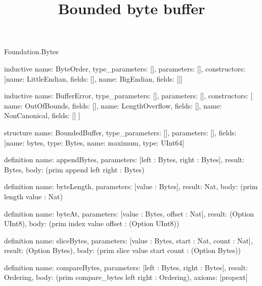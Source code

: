 \begin{lexlean}{Foundation.Bytes}
\title{Bounded byte buffer}
\begin{semanticmodule}
inductive{
  name: ByteOrder,
  type_parameters: [],
  parameters: [],
  constructors: [{name: LittleEndian, fields: []}, {name: BigEndian, fields: []}]
}

inductive{
  name: BufferError,
  type_parameters: [],
  parameters: [],
  constructors: [
    {name: OutOfBounds, fields: []},
    {name: LengthOverflow, fields: []},
    {name: NonCanonical, fields: []}
  ]
}

structure{
  name: BoundedBuffer,
  type_parameters: [],
  parameters: [],
  fields: [{name: bytes, type: Bytes}, {name: maximum, type: UInt64}]
}

definition{
  name: appendBytes,
  parameters: [left : Bytes, right : Bytes],
  result: Bytes,
  body: (prim append left right : Bytes)
}

definition{
  name: byteLength,
  parameters: [value : Bytes],
  result: Nat,
  body: (prim length value : Nat)
}

definition{
  name: byteAt,
  parameters: [value : Bytes, offset : Nat],
  result: (Option UInt8),
  body: (prim index value offset : (Option UInt8))
}

definition{
  name: sliceBytes,
  parameters: [value : Bytes, start : Nat, count : Nat],
  result: (Option Bytes),
  body: (prim slice value start count : (Option Bytes))
}

definition{
  name: compareBytes,
  parameters: [left : Bytes, right : Bytes],
  result: Ordering,
  body: (prim compare_bytes left right : Ordering),
  axioms: [propext]
}
\end{semanticmodule}
\end{lexlean}
